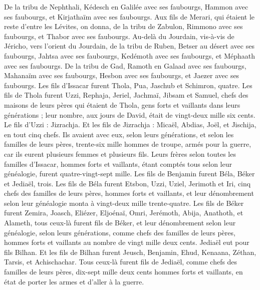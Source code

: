 \begin{multicols}{2}
De la tribu de Nephthali, Kédesch en Galilée avec ses faubourgs, Hammon avec ses faubourgs, et Kirjathaïm avec ses faubourgs.
Aux fils de Merari, qui étaient le reste d'entre les Lévites, on donna, de la tribu de Zabulon, Rimmono avec ses faubourgs, et Thabor avec ses faubourgs.
Au-delà du Jourdain, vis-à-vis de Jéricho, vers l'orient du Jourdain, de la tribu de Ruben, Betser au désert avec ses faubourgs, Jahtsa avec ses faubourgs,
Kedémoth avec ses faubourgs, et Méphaath avec ses faubourgs.
De la tribu de Gad, Ramoth en Galaad avec ses faubourgs, Mahanaïm avec ses faubourgs,
Hesbon avec ses faubourgs, et Jaezer avec ses faubourgs.
\VerseOne{}Les fils d'Issacar furent Thola, Pua, Jaschub et Schimron, quatre.
Les fils de Thola furent Uzzi, Rephaja, Jeriel, Jachmaï, Jibsam et Samuel, chefs des maisons de leurs pères qui étaient de Thola, gens forts et vaillants dans leurs générations ; leur nombre, aux jours de David, était de vingt-deux mille six cents.
Le fils d'Uzzi : Jizrachja. Et les fils de Jizrachja : Micaël, Abdias, Joël, et Jischija, en tout cinq chefs.
Ils avaient avec eux, selon leurs générations, et selon les familles de leurs pères, trente-six mille hommes de troupe, armés pour la guerre, car ils eurent plusieurs femmes et plusieurs fils.
Leurs frères selon toutes les familles d'Issacar, hommes forts et vaillants, étant comptés tous selon leur généalogie, furent quatre-vingt-sept mille.
Les fils de Benjamin furent Béla, Béker et Jediaël, trois.
Les fils de Béla furent Etsbon, Uzzi, Uziel, Jerimoth et Iri, cinq chefs des familles de leurs pères, hommes forts et vaillants, et leur dénombrement selon leur généalogie monta à vingt-deux mille trente-quatre.
Les fils de Béker furent Zemira, Joasch, Eliézer, Eljoénaï, Omri, Jerémoth, Abija, Anathoth, et Alameth, tous ceux-là furent fils de Béker,
et leur dénombrement selon leur généalogie, selon leurs générations, comme chefs des familles de leurs pères, hommes forts et vaillants au nombre de vingt mille deux cents.
Jediaël eut pour fils Bilhan. Et les fils de Bilhan furent Jeusch, Benjamin, Ehud, Kenaana, Zéthan, Tarsis, et Achischachar.
Tous ceux-là furent fils de Jediaël, comme chefs des familles de leurs pères, dix-sept mille deux cents hommes forts et vaillants, en état de porter les armes et d'aller à la guerre.

\end{multicols}
